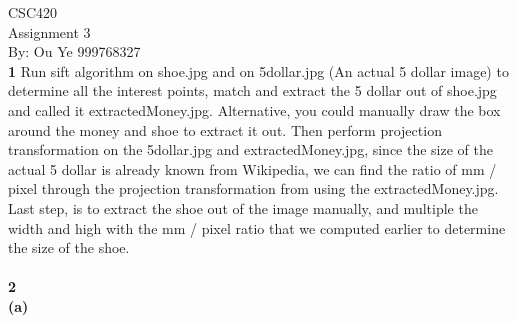 \documentclass[11pt]{article}
\begin{document}
 
\noindent
CSC420\\
Assignment 3 \\
By: Ou Ye 999768327\\

\noindent
\textbf{1} 
Run sift algorithm on shoe.jpg and on 5dollar.jpg (An actual 5 dollar image) to determine all the interest points, match and extract the 5 dollar out of shoe.jpg and called it extractedMoney.jpg. Alternative, you could manually draw the box around the money and shoe to extract it out. Then perform projection transformation on the 5dollar.jpg and extractedMoney.jpg, since the size of the actual 5 dollar is already known from Wikipedia, we can find the ratio of mm / pixel through the projection transformation from using the extractedMoney.jpg. \\

\noindent
Last step, is to extract the shoe out of the image manually, and multiple the width and high with the  mm / pixel ratio that we computed earlier to determine the size of the shoe.  \\\\

\noindent
\textbf{2} \\
\textbf{(a)} \\
 
\end{document}

